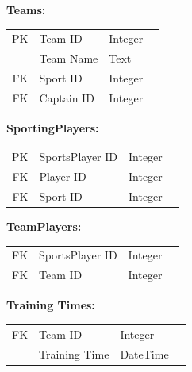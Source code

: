 \documentclass[10pt]{article}
\begin{document}
                \begin{center}
                    \textbf{Teams:}
                    \begin{tabular}{ | r | l | l | p{10cm} } 
                        \cline{1-3}
                        PK & Team ID & Integer & \\ \cline{1-3}
                        & Team Name & Text & \\ \cline{1-3}
                        FK & Sport ID & Integer & \\ \cline{1-3}
                        FK & Captain ID & Integer & \\ \cline{1-3}
                    \end{tabular}
                \end{center}

                \begin{center}
                    \textbf{SportingPlayers:}
                    \begin{tabular}{ | r | l | l | p{10cm} } 
                        \cline{1-3}
                        PK & SportsPlayer ID & Integer & \\ \cline{1-3}
                        FK & Player ID & Integer & \\ \cline{1-3}
                        FK & Sport ID & Integer & \\ \cline{1-3}
                    \end{tabular}
                \end{center}

                \begin{center}
                    \textbf{TeamPlayers:}
                    \begin{tabular}{ | r | l | l | p{10cm} } 
                        \cline{1-3}
                        FK & SportsPlayer ID & Integer & \\ \cline{1-3}
                        FK & Team ID & Integer & \\ \cline{1-3}
                    \end{tabular}
                \end{center}

                \begin{center}
                    \textbf{Training Times:}
                    \begin{tabular}{ | r | l | l | p{10cm} }
                        \cline{1-3}
                        FK & Team ID & Integer & \\ \cline{1-3}
                        & Training Time & DateTime & \\ \cline{1-3}
                    \end{tabular}
                \end{center}
\end{document}
